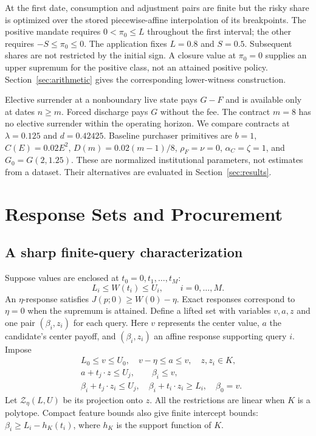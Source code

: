 At the first date, consumption and adjustment pairs are finite but the risky share is optimized over the stored piecewise-affine interpolation of its breakpoints. The positive mandate requires $0<\pi_0\leq L$ throughout the first interval; the other requires $-S\leq\pi_0\leq0$. The application fixes $L=0.8$ and $S=0.5$. Subsequent shares are not restricted by the initial sign. A closure value at $\pi_0=0$ supplies an upper supremum for the positive class, not an attained positive policy. Section~\ref{sec:arithmetic} gives the corresponding lower-witness construction.

Elective surrender at a nonboundary live state pays $G-F$ and is available only at dates $n\geq m$. Forced discharge pays $G$ without the fee. The contract $m=8$ has no elective surrender within the operating horizon. We compare contracts at $\lambda=0.125$ and $d=0.42425$. Baseline purchaser primitives are $b=1$, $C(E)=0.02E^2$, $D(m)=0.02(m-1)/8$, $\rho_F=\nu=0$, $\alpha_C=\zeta=1$, and $G_0=G(2,1.25)$. These are normalized institutional parameters, not estimates from a dataset. Their alternatives are evaluated in Section~\ref{sec:results}.

\section{Response Sets and Procurement}
\label{sec:response}
\subsection{A sharp finite-query characterization}
Suppose values are enclosed at $t_0=0,t_1,\ldots,t_M$:
\begin{equation}
 L_i\leq W(t_i)\leq U_i,\qquad i=0,\ldots,M.
 \label{eq:queries}
\end{equation}
An $\eta$-response satisfies $J(p;0)\geq W(0)-\eta$. Exact responses correspond to $\eta=0$ when the supremum is attained. Define a lifted set with variables $v,a,z$ and one pair $(\beta_i,z_i)$ for each query. Here $v$ represents the center value, $a$ the candidate's center payoff, and $(\beta_i,z_i)$ an affine response supporting query $i$. Impose
\begin{align}
 &L_0\leq v\leq U_0,\quad v-\eta\leq a\leq v,\quad z,z_i\in K,
 \label{eq:oracle1}\\
 &a+t_j\cdot z\leq U_j,\qquad \beta_i\leq v,
 \label{eq:oracle2}\\
 &\beta_i+t_j\cdot z_i\leq U_j,\quad
   \beta_i+t_i\cdot z_i\geq L_i,\quad \beta_0=v.
 \label{eq:oracle3}
\end{align}
Let $\mathcal Z_\eta(L,U)$ be its projection onto $z$. All the restrictions are linear when $K$ is a polytope. Compact feature bounds also give finite intercept bounds: $\beta_i\geq L_i-h_K(t_i)$, where $h_K$ is the support function of $K$.

